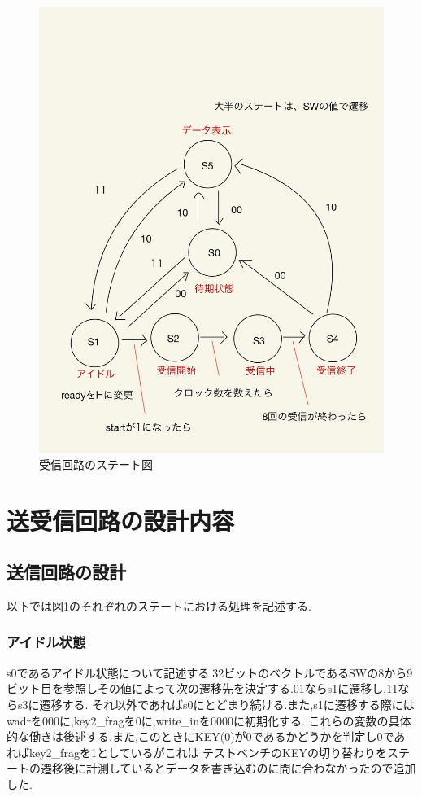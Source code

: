 \documentclass[dvipdfmx]{jarticle}
\begin{document}
\begin{figure}[h]
\begin{minipage}[b]{0.45\linewidth}
      \includegraphics[keepaspectratio, scale=0.1]{state_receive.jpg}
      \caption{受信回路のステート図}
    \end{minipage}
  \end{figure}
\section{送受信回路の設計内容}
\subsection{送信回路の設計}
以下では図1のそれぞれのステートにおける処理を記述する.
\subsubsection{アイドル状態}
s0であるアイドル状態について記述する.32ビットのベクトルであるSWの8から9ビット目を参照しその値によって次の遷移先を決定する.01ならs1に遷移し,11ならs3に遷移する.
それ以外であればs0にとどまり続ける.また,s1に遷移する際にはwadrを000に,key2\_fragを0に,write\_inを0000に初期化する.
これらの変数の具体的な働きは後述する.また,このときにKEY(0)が0であるかどうかを判定し0であればkey2\_fragを1としているがこれは
テストベンチのKEYの切り替わりをステートの遷移後に計測しているとデータを書き込むのに間に合わなかったので追加した.
\end{document}
